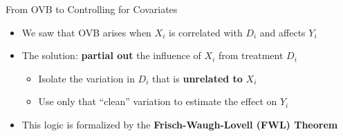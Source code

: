 \documentclass[dvipsnames,hyperref={pdfpagelabels=false}]{beamer}
\begin{document}
\begin{frame}{From OVB to Controlling for Covariates}
	\begin{itemize}
		\item We saw that OVB arises when $X_i$ is correlated with $D_i$ and affects $Y_i$
		\vspace{0.3cm}
		\item The solution: \textbf{partial out} the influence of $X_i$ from treatment $D_i$
		\vspace{0.3cm}
		\begin{itemize}
			\item Isolate the variation in $D_i$ that is \textbf{unrelated to} $X_i$
			\vspace{0.2cm}
			\item Use only that ``clean'' variation to estimate the effect on $Y_i$
		\end{itemize}
		\vspace{0.3cm}
		\item This logic is formalized by the \textbf{Frisch-Waugh-Lovell (FWL) Theorem}
	\end{itemize}
\end{frame}



       		
       		
\end{document}
